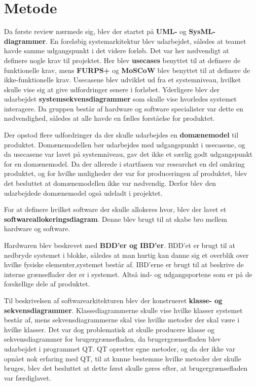 \section{Metode}

Da første review nærmede sig, blev der startet på \textbf{UML-} og \textbf{SysML-diagrammer}. En foreløbig systemarkitektur blev udarbejdet, således at teamet havde samme udgangspunkt i det videre forløb. Det var her nødvendigt at definere nogle krav til projektet. Her blev \textbf{usecases} benyttet til at definere de funktionelle krav, mens \textbf{FURPS+} og \textbf{MoSCoW} blev benyttet til at definere de ikke-funktionelle krav. Usecasene blev udviklet ud fra et systemniveau, hvilket skulle vise sig at give udfordringer senere i forløbet.
Yderligere blev der udarbejdet \textbf{systemsekvensdiagrammer} som skulle vise hvorledes systemet interagere. Da gruppen består af hardware og software specialister var dette en nødvendighed, således at alle havde en fælles forståelse for produktet.

Der opstod flere udfordringer da der skulle udarbejdes en \textbf{domænemodel} til produktet. Domænemodellen bør udarbejdes med udgangspunkt i usecasene, og da usecasene var lavet på systemniveau, gav det ikke et særlig godt udgangspunkt for en domænemodel. Da der allerede i startfasen var researchet en del omkring produktet, og for hvilke muligheder der var for produceringen af produktet, blev det besluttet at domænemodellen ikke var nødvendig. Derfor blev den udarbejdede domænemodel også udeladt i projektet.
 
For at definere hvilket software der skulle allokeres hvor, blev der lavet et \textbf{softwareallokeringsdiagram}. Denne blev brugt til at skabe bro mellem hardware og software.

Hardwaren blev beskrevet med \textbf{BDD’er og IBD’er}. BDD’et er brugt til at nedbryde systemet i blokke, således at man hurtig kan danne sig et overblik over hvilke fysiske elementer,systemet består af. 
IBD’erne er brugt til at beskrive de interne grænseflader der er i systemet. Altså ind- og udgangsportene som er på de forskellige dele af produktet.

Til beskrivelsen af softwarearkitekturen blev der konstrueret \textbf{klasse- og sekvensdiagrammer}. Klassediagrammerne skulle vise hvilke klasser systemet består af, mens sekvensdiagrammerne skal vise hvilke metoder der skal være i hvilke klasser. Det var dog problematisk at skulle producere klasse og sekvensdiagrammer for brugergrænsefladen, da brugergrænsefladen blev udarbejdet i programmet QT. QT opretter egne metoder, og da der ikke var opnået nok erfaring med QT, til at kunne bestemme hvilke metoder der skulle bruges, blev det besluttet at dette først skulle gøres efter, at brugergrænsefladen var færdiglavet.
